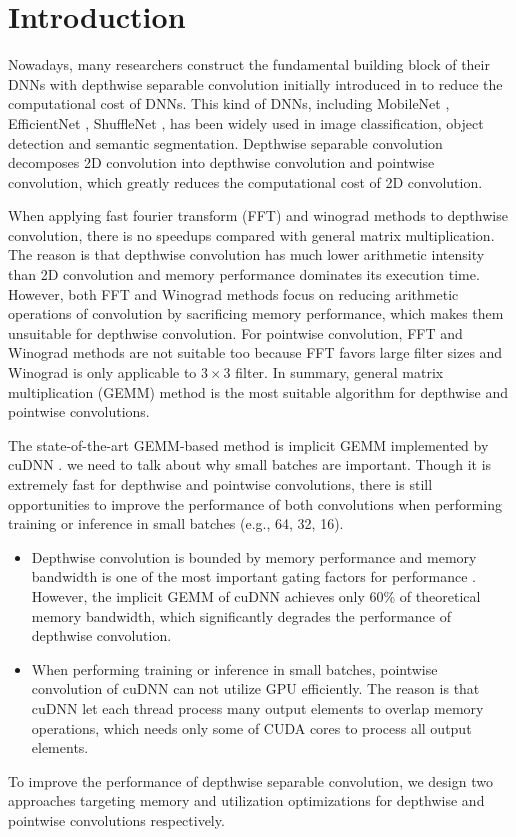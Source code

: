 \section{Introduction}
Nowadays, many researchers construct the fundamental building block of their DNNs with depthwise separable convolution initially introduced in \cite{sifre2014rigid}  to reduce the computational cost of DNNs. 
This kind of DNNs, including MobileNet \cite{Sandler_2018_CVPR,howard2019searching}, EfficientNet \cite{tan2019efficientnet}, ShuffleNet \cite{Ma_2018_ECCV}, has been widely used in image classification, object detection and  semantic segmentation.
Depthwise separable convolution decomposes 2D convolution into depthwise convolution and pointwise convolution, which greatly reduces the computational cost of 2D convolution. 

When applying fast fourier transform (FFT) \cite{vasilache2014fast} and winograd \cite{lavin2016fast} methods to depthwise convolution, there is no speedups compared with general matrix multiplication. 
The reason is that depthwise convolution has much lower arithmetic intensity than 2D convolution and memory performance dominates its execution time. 
However, both FFT and Winograd methods focus on reducing arithmetic operations of convolution by sacrificing memory performance, which makes them unsuitable for depthwise convolution.
For pointwise convolution, FFT and Winograd methods are not suitable too because FFT favors large filter sizes and Winograd is only applicable to $3 \times 3$ filter.
In summary, general matrix multiplication (GEMM) \cite{Vasudevan2017Parallel,Chellapilla2006High} method is the most suitable algorithm for depthwise and pointwise convolutions.

The state-of-the-art GEMM-based method is implicit GEMM implemented by cuDNN \cite{ChetlurWVCTCS14}.
{\color{red}we need to talk about why small batches are important.}
Though it is extremely fast for depthwise and pointwise convolutions, there is still opportunities to improve the performance of both convolutions when performing training or inference in small batches (e.g., 64, 32, 16).
\begin{itemize}
    \item Depthwise convolution is bounded by memory performance and memory bandwidth is one of the most important gating factors for performance \cite{cudaperformance}. 
    However, the implicit GEMM of cuDNN achieves only 60\% of theoretical memory bandwidth, which significantly degrades the performance of depthwise convolution.
    \item When performing training or inference in small batches, pointwise convolution of cuDNN can not utilize GPU efficiently.
    The reason is that cuDNN let each thread process many output elements to overlap memory operations, which needs only some of CUDA cores to process all output elements. 
\end{itemize}
To improve the performance of depthwise separable convolution, we design two approaches targeting memory and utilization optimizations for depthwise and pointwise convolutions respectively. 

